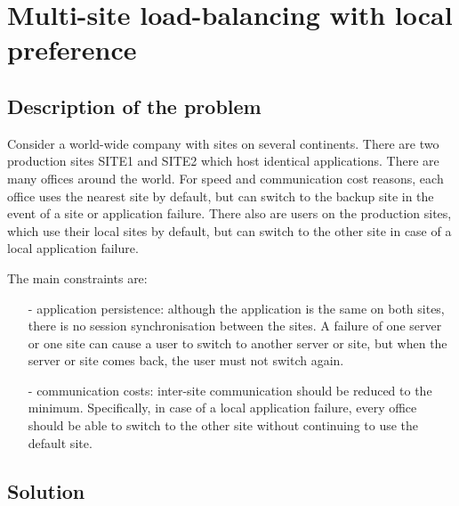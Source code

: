 \section{Multi-site load-balancing with local preference}
\label{sec:multi_site_load_balancing_with_local_preference}

\subsection{Description of the problem}

Consider a world-wide company with sites on several continents. There are two
production sites SITE1 and SITE2 which host identical applications. There are
many offices around the world. For speed and communication cost reasons, each
office uses the nearest site by default, but can switch to the backup site in
the event of a site or application failure. There also are users on the
production sites, which use their local sites by default, but can switch to the
other site in case of a local application failure.

The main constraints are:

\begin{itemize}
\item[-] application persistence: although the application is the same on both
    sites, there is no session synchronisation between the sites. A failure
    of one server or one site can cause a user to switch to another server
    or site, but when the server or site comes back, the user must not switch
    again.

\item[-] communication costs: inter-site communication should be reduced to the
    minimum. Specifically, in case of a local application failure, every
    office should be able to switch to the other site without continuing to
    use the default site.
\end{itemize}

\subsection{Solution}

